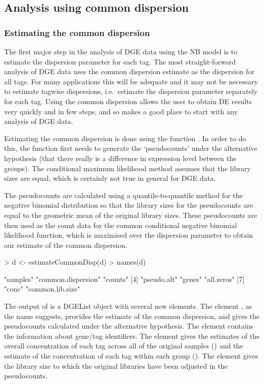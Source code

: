 \subsection{Analysis using common dispersion}
\subsubsection{Estimating the common dispersion}
The first major step in the analysis of DGE data using the NB model is
to estimate the dispersion parameter for each tag. The most
straight-forward analysis of DGE data uses the common dispersion
estimate as the dispersion for all tags. For many applications this
will be adequate and it may not be necessary to estimate tagwise
dispersions, i.e.~estimate the dispersion parameter separately for
each tag. Using the common dispersion allows the user to obtain DE
results very quickly and in few steps, and so makes a good place to
start with any analysis of DGE data.

Estimating the common dispersion is done using the function
. In order to do this, the function first
needs to generate the `pseudocounts' under the alternative hypothesis
(that there really is a difference in expression level between the
groups). The conditional maximum likelihood method assumes that the
library sizes are equal, which is certainly not true in general for
DGE data.

The pseudocounts are calculated using a quantile-to-quantile method
for the negative binomial distribution so that the library sizes for
the pseudocounts are equal to the geometric mean of the original
library sizes. These pseudocounts are then used as the count data for
the common conditional negative binomial likelihood function, which is
maximised over the dispersion parameter to obtain our estimate of the
common dispersion.

\begin{Schunk}
\begin{Sinput}
> d <- estimateCommonDisp(d)
> names(d)
\end{Sinput}
\begin{Soutput}
[1] "samples"           "common.dispersion" "counts"           
[4] "pseudo.alt"        "genes"             "all.zeros"        
[7] "conc"              "common.lib.size"  
\end{Soutput}
\end{Schunk}

The output of  is a DGEList object with
several new elements. The element , as the
name suggests, provides the estimate of the common dispersion, and
 gives the pseudocounts calculated under the
alternative hypothesis. The element  contains the
information about gene/tag identifiers. The element  gives
the estimates of the overall concentration of each tag across all of
the original samples () and the estimate of
the concentration of each tag within each group
(). The element  gives
the library size to which the original libraries have been adjusted in
the pseudocounts.

